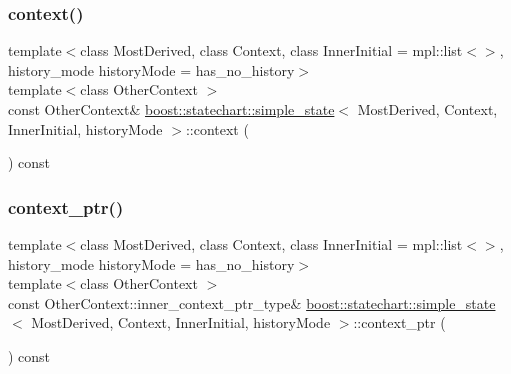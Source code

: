 \subsubsection{\texorpdfstring{context()}{context()}\hspace{0.1cm}{\footnotesize\ttfamily [2/2]}}
{\footnotesize\ttfamily template$<$class Most\+Derived, class Context, class Inner\+Initial = mpl\+::list$<$$>$, history\+\_\+mode history\+Mode = has\+\_\+no\+\_\+history$>$ \\
template$<$class Other\+Context $>$ \\
const Other\+Context\& \mbox{\hyperlink{classboost_1_1statechart_1_1simple__state}{boost\+::statechart\+::simple\+\_\+state}}$<$ Most\+Derived, Context, Inner\+Initial, history\+Mode $>$\+::context (\begin{DoxyParamCaption}{ }\end{DoxyParamCaption}) const\hspace{0.3cm}{\ttfamily [inline]}}

\mbox{\label{classboost_1_1statechart_1_1simple__state_aa873e22b50b0925f6a663583d6c5b216}} 
\subsubsection{\texorpdfstring{context\+\_\+ptr()}{context\_ptr()}}
{\footnotesize\ttfamily template$<$class Most\+Derived, class Context, class Inner\+Initial = mpl\+::list$<$$>$, history\+\_\+mode history\+Mode = has\+\_\+no\+\_\+history$>$ \\
template$<$class Other\+Context $>$ \\
const Other\+Context\+::inner\+\_\+context\+\_\+ptr\+\_\+type\& \mbox{\hyperlink{classboost_1_1statechart_1_1simple__state}{boost\+::statechart\+::simple\+\_\+state}}$<$ Most\+Derived, Context, Inner\+Initial, history\+Mode $>$\+::context\+\_\+ptr (\begin{DoxyParamCaption}{ }\end{DoxyParamCaption}) const\hspace{0.3cm}{\ttfamily [inline]}}

\mbox{\label{classboost_1_1statechart_1_1simple__state_a0676228f11200b54ab55883626eac8cd}} 
